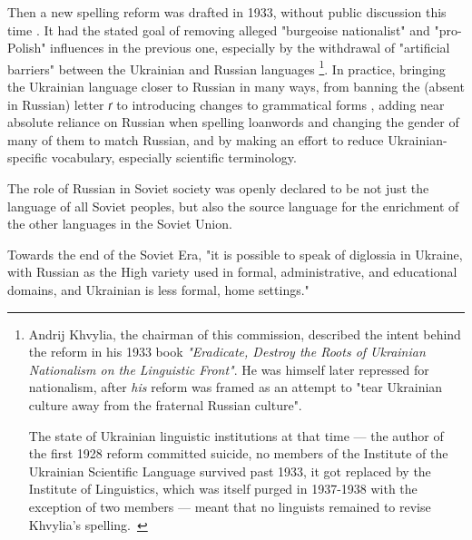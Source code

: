 Then a new \textquotesingle spelling\textquotesingle{} reform was drafted
in 1933, without public discussion this time
\cite{5c48fce9-c05d-3d4e-94c1-cd6079bff660}. It had the stated goal of
removing alleged "burgeoise nationalist" and "pro-Polish" influences in
the previous one, especially by the withdrawal of "artificial barriers"
between the Ukrainian and Russian languages%
\footnote{Andrij Khvylia, the chairman of this commission, described the intent behind the reform in his 1933 book \textit{"Eradicate, Destroy the Roots of Ukrainian Nationalism on the Linguistic Front"}.   He was himself later repressed for nationalism, after \textit{his} reform was framed as an attempt to "tear Ukrainian culture away from the fraternal Russian culture". 

The state of Ukrainian linguistic institutions at that time — the author of the first 1928 reform committed suicide, no members of the Institute of the Ukrainian Scientific Language survived past 1933, it got replaced by the Institute of Linguistics, which was itself purged in 1937-1938 with the exception of two members — meant that no linguists remained to revise Khvylia's spelling.~\cite{5c48fce9-c05d-3d4e-94c1-cd6079bff660}
}\cite{karunyk2017ukrainian}.
In practice, bringing the Ukrainian language closer to Russian in many
ways, from banning the (absent in Russian) letter \emph{ґ} to
introducing changes to grammatical forms \cite{karunyk2017ukrainian},
adding near absolute reliance on Russian when spelling loanwords and
changing the gender of many of them to match Russian, and by making an
effort to reduce Ukrainian-specific
vocabulary\cite{5c48fce9-c05d-3d4e-94c1-cd6079bff660}, especially
scientific terminology.

The role of Russian in Soviet society was openly declared to be not just
the language of all Soviet peoples, but also the source language for the
enrichment of the other languages in the Soviet
Union.\cite{press2015ukrainian}


Towards the end of the Soviet Era, "it is possible to speak of diglossia
in Ukraine, with Russian as the High variety used in formal,
administrative, and educational domains, and Ukrainian is less formal,
home settings." \cite{grenoble2010contact}

